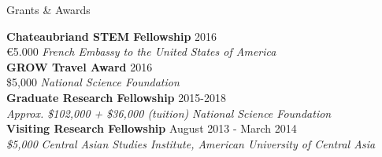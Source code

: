 \documentclass{resume} %
\begin{document}
\vspace{.25cm}

\begin{minipage}{\textwidth}

\begin{rSection}{Grants \& Awards}
\vspace{.15cm}

{\bf Chateaubriand STEM Fellowship} \hfill {2016} \\ 
{\euro{5.000}} \hfill {\em French Embassy to the United States of America} \\


{\bf GROW Travel Award} \hfill {2016} \\ 
{\$5,000} \hfill {\em National Science Foundation} \\


{\bf Graduate Research Fellowship} \hfill {2015-2018} \\ 
{\em Approx. \$102,000 + \$36,000 (tuition)} \hfill {\em National Science Foundation} \\




{\bf Visiting Research Fellowship} \hfill {August 2013 - March 2014} \\ 
{\em \$5,000} \hfill {\em Central Asian Studies Institute, American University of Central Asia} \\


\end{rSection}
\end{minipage}
\end{document}
